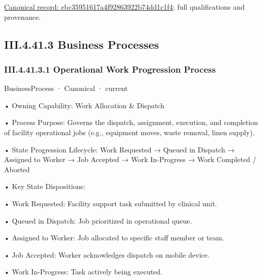 {\footnotesize \href{../../../../continuum/business/business-function/ebc35951617a4f92863922b74dd1c1f4.md}{Canonical record: ebc35951617a4f92863922b74dd1c1f4}; full qualifications and provenance.}\par
\subsection*{III.4.41.3 Business Processes}
\label{navigation:III.4.41.3}

\subsubsection*{III.4.41.3.1 Operational Work Progression Process}
\label{navigation:III.4.41.3.1}

\label{element:5ebba522194b4de5a5b3963e855d712d}
{\small BusinessProcess · Canonical · current}\par

•
Owning Capability: Work Allocation \& Dispatch



•
Process Purpose: Governs the dispatch, assignment, execution, and completion of facility operational jobs (e.g., equipment moves, waste removal, linen supply).



•
State Progression Lifecycle: Work Requested → Queued in Dispatch → Assigned to Worker → Job Accepted → Work In-Progress → Work Completed / Aborted



•
Key State Dispositions:



•
Work Requested: Facility support task submitted by clinical unit.



•
Queued in Dispatch: Job prioritized in operational queue.



•
Assigned to Worker: Job allocated to specific staff member or team.



•
Job Accepted: Worker acknowledges dispatch on mobile device.



•
Work In-Progress: Task actively being executed.



